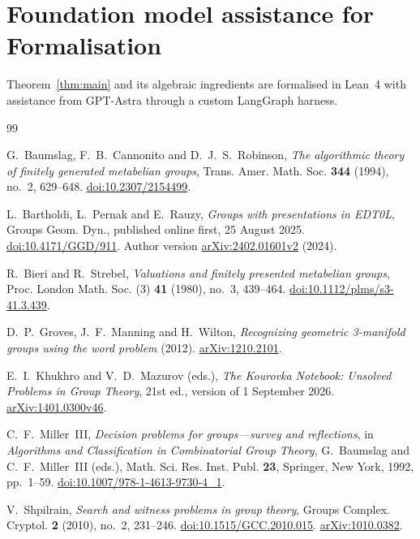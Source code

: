 \documentclass[12pt]{article}
\numberwithin{equation}{section}
\theoremstyle{definition}
\theoremstyle{remark}
\begin{document}
\section*{Foundation model assistance for Formalisation}
Theorem~\ref{thm:main} and its algebraic ingredients are formalised
in Lean~4 with assistance from GPT-Astra through a custom LangGraph harness.
\clearpage
\begin{thebibliography}{99}

G.~Baumslag, F.~B.~Cannonito and D.~J.~S.~Robinson,
\emph{The algorithmic theory of finitely generated metabelian groups},
Trans. Amer. Math. Soc. \textbf{344} (1994), no.~2, 629--648.
\href{https://doi.org/10.2307/2154499}{doi:10.2307/2154499}.

L.~Bartholdi, L.~Pernak and E.~Rauzy,
\emph{Groups with presentations in EDT0L},
Groups Geom. Dyn., published online first, 25 August 2025.
\href{https://doi.org/10.4171/GGD/911}{doi:10.4171/GGD/911}.
Author version \href{https://arxiv.org/abs/2402.01601v2}{arXiv:2402.01601v2}
(2024).

R.~Bieri and R.~Strebel,
\emph{Valuations and finitely presented metabelian groups},
Proc. London Math. Soc. (3) \textbf{41} (1980), no.~3, 439--464.
\href{https://doi.org/10.1112/plms/s3-41.3.439}{doi:10.1112/plms/s3-41.3.439}.

D.~P.~Groves, J.~F.~Manning and H.~Wilton,
\emph{Recognizing geometric 3-manifold groups using the word problem}
(2012).
\href{https://arxiv.org/abs/1210.2101}{arXiv:1210.2101}.

E.~I.~Khukhro and V.~D.~Mazurov (eds.),
\emph{The Kourovka Notebook: Unsolved Problems in Group Theory},
21st ed., version of 1 September 2026.
\href{https://arxiv.org/abs/1401.0300v46}{arXiv:1401.0300v46}.

C.~F.~Miller~III,
\emph{Decision problems for groups---survey and reflections},
in \emph{Algorithms and Classification in Combinatorial Group Theory},
G.~Baumslag and C.~F.~Miller~III (eds.),
Math. Sci. Res. Inst. Publ. \textbf{23},
Springer, New York, 1992, pp.~1--59.
\href{https://doi.org/10.1007/978-1-4613-9730-4_1}{doi:10.1007/978-1-4613-9730-4\_1}.

V.~Shpilrain,
\emph{Search and witness problems in group theory},
Groups Complex. Cryptol. \textbf{2} (2010), no.~2, 231--246.
\href{https://doi.org/10.1515/GCC.2010.015}{doi:10.1515/GCC.2010.015}.
\href{https://arxiv.org/abs/1010.0382}{arXiv:1010.0382}.

\end{thebibliography}
\end{document}
